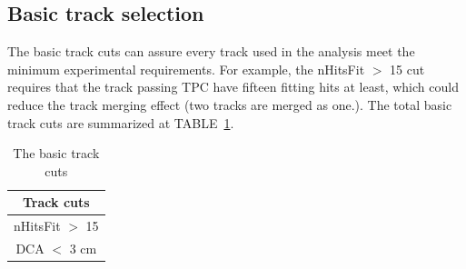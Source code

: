 \subsection{Basic track selection}

The basic track cuts can assure every track used in the analysis meet the minimum experimental requirements.
For example, the nHitsFit $ > $ 15 cut requires that the track passing TPC have fifteen fitting hits at least,
which could reduce the track merging effect (two tracks are merged as one.). 
The total basic track cuts are summarized at TABLE~\ref{tab:trackCut}.

\begin{table}
    \centering
    \begin{tabular}{|c|} \hline  
         Track cuts\\ \hline  
         nHitsFit $>$ 15\\ \hline
        DCA $<$ 3 cm\\ \hline
    \end{tabular}
    \caption{The basic track cuts}
    \label{tab:trackCut}
\end{table}